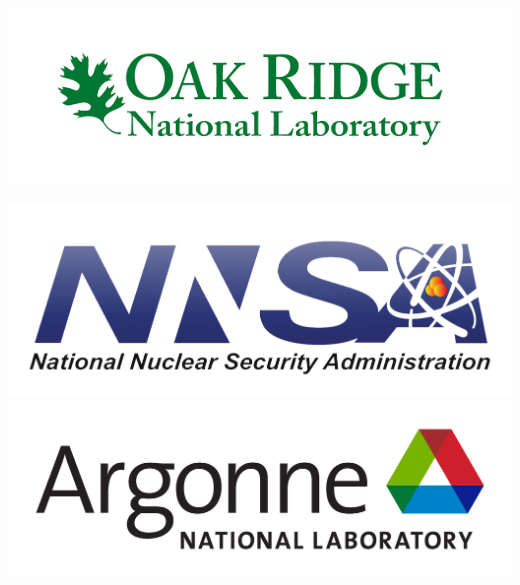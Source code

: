 {\begin{center}
\begin{minipage}{0.7\linewidth}
\begin{tcolorbox}[colback=white, colframe=black, width=\linewidth, height=.275\linewidth, boxrule=1pt]
\begin{center}
\begin{minipage}{.3\linewidth}
\begin{center}
                        \newline\vspace{-1.5em}
                        \includegraphics[width = \linewidth]{img/ornl.png}
                    \end{center}
                \end{minipage}
                \begin{minipage}{.3\linewidth}
                    \begin{center}
                        \includegraphics[width = \linewidth]{img/nnsa.png}
                        \newline\vspace{-1.5em}
                        \includegraphics[width = \linewidth]{img/anl.png}
                    \end{center}
                \end{minipage}

\end{center}
\end{tcolorbox}
\end{minipage}
\end{center}}
